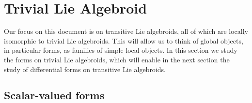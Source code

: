     

\section{Trivial Lie Algebroid}

    


    

Our focus on this document is on transitive Lie algebroids, all of which are locally isomorphic to trivial Lie algebroids. This will allow us to think of global objects, in particular forms, as families of simple local objects. In this section we study the forms on trivial Lie algebroids, which will enable in the next section the study of differential forms on transitive Lie algebroids.

\subsection{Scalar-valued forms}

